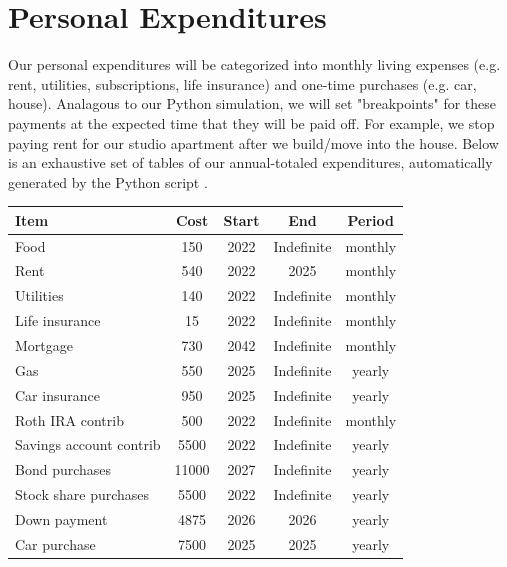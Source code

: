 \documentclass[12pt]{article}
\begin{document}
\section{Personal Expenditures}

Our personal expenditures will be categorized into monthly living expenses (e.g. rent, utilities, subscriptions, life insurance) and one-time purchases (e.g. car, house).
Analagous to our Python simulation, we will set "breakpoints" for these payments at the expected time that they will be paid off.
For example, we stop paying rent for our studio apartment after we build/move into the house. Below is an exhaustive set of tables of our annual-totaled expenditures, automatically generated by the Python script \cite{car}\cite{mortgate}\cite{EmFund}.

\begin{center}
    \begin{center}
        \begin{tabular}{|l|c|c|c|c|}
                \hline
                \textbf{Item} & \textbf{Cost} & \textbf{Start} & \textbf{End} & \textbf{Period} \\
                \hline
                Food & 150 & 2022 & Indefinite & monthly \\
                \hline
                Rent & 540 & 2022 & 2025 & monthly \\
                \hline
                Utilities & 140 & 2022 & Indefinite & monthly \\
                \hline
                Life insurance & 15 & 2022 & Indefinite & monthly \\
                \hline
                Mortgage & 730 & 2042 & Indefinite & monthly \\
                \hline
                Gas & 550 & 2025 & Indefinite & yearly \\
                \hline
                Car insurance & 950 & 2025 & Indefinite & yearly \\
                \hline
                Roth IRA contrib & 500 & 2022 & Indefinite & monthly \\
                \hline
                Savings account contrib & 5500 & 2022 & Indefinite & yearly \\
                \hline
                Bond purchases & 11000 & 2027 & Indefinite & yearly \\
                \hline
                Stock share purchases & 5500 & 2022 & Indefinite & yearly \\
                \hline
                Down payment & 4875 & 2026 & 2026 & yearly \\
                \hline
                Car purchase & 7500 & 2025 & 2025 & yearly \\
                \hline
        \end{tabular}
\end{center}
\end{center}
\end{document}
